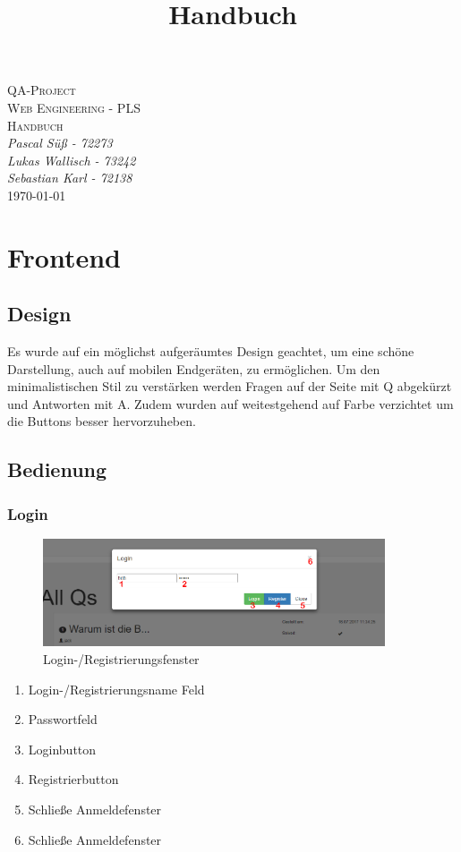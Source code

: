 \documentclass[a4paper]{report}
\begin{document}
\begin{titlepage}
	\centering
	{\scshape\Huge QA-Project}
	\vspace{1cm} \\
	{\scshape\LARGE Web Engineering - PLS}
	\vspace{1cm} \\
	{\scshape\LARGE Handbuch}
	\vspace{1cm} \\
	{\large\itshape Pascal Süß - 72273} \\
	\vspace{0.5cm}
	{\large\itshape Lukas Wallisch - 73242} \\ 
	\vspace{0.5cm}
	{\large\itshape Sebastian Karl - 72138} \\ 
	\vfill
	{\large \today}
\end{titlepage}
\title{Handbuch}

\tableofcontents

\part{Frontend}
\chapter{Design}
Es wurde auf ein möglichst aufgeräumtes Design geachtet, um eine schöne Darstellung, auch auf mobilen Endgeräten, zu ermöglichen. Um den minimalistischen Stil zu verstärken werden Fragen auf der Seite mit Q abgekürzt und Antworten mit A. Zudem wurden auf weitestgehend auf Farbe verzichtet um die Buttons besser hervorzuheben.
\chapter{Bedienung}
\section{Login}
\begin{figure}[h!]
	\centering
	\includegraphics[width=0.9\textwidth]{Login.PNG}
	\caption{Login-/Registrierungsfenster}
	\label{fig:Loginfenster}
\end{figure}
\centering\begin{enumerate}
	\item Login-/Registrierungsname Feld
	\item Passwortfeld
	\item Loginbutton
	\item Registrierbutton
	\item Schließe Anmeldefenster
	\item Schließe Anmeldefenster
\end{enumerate}
\newpage
\end{document}
